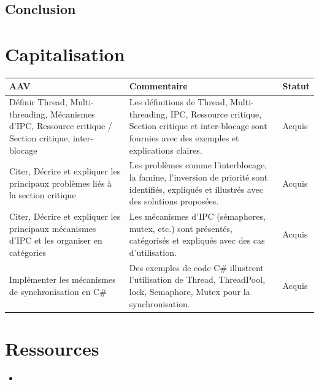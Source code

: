 \subsection*{Conclusion}
{}

\newpage

\section*{Capitalisation}

\begin{center}
\setlength{\tabcolsep}{10pt}

\begin{tabular}{|p{}|p{}|m{}|}
\hline
\textbf{AAV} & \textbf{Commentaire} & \textbf{Statut} \\ \hline

Définir Thread, Multi-threading, Mécanismes d'IPC, Ressource critique / Section critique, inter-blocage &
Les définitions de Thread, Multi-threading, IPC, Ressource critique, Section critique et inter-blocage sont fournies avec des exemples et explications claires. &
{\color{green!60!black}Acquis} \\ \hline

Citer, Décrire et expliquer les principaux problèmes liés à la section critique &
Les problèmes comme l'interblocage, la famine, l'inversion de priorité sont identifiés, expliqués et illustrés avec des solutions proposées. &
{\color{green!60!black}Acquis} \\ \hline

Citer, Décrire et expliquer les principaux mécanismes d'IPC et les organiser en catégories &
Les mécanismes d'IPC (sémaphores, mutex, etc.) sont présentés, catégorisés et expliqués avec des cas d'utilisation. &
{\color{green!60!black}Acquis} \\ \hline

Implémenter les mécanismes de synchronisation en C\# &
Des exemples de code C\# illustrent l'utilisation de Thread, ThreadPool, lock, Semaphore, Mutex pour la synchronisation. &
{\color{green!60!black}Acquis} \\ \hline

\end{tabular}
\end{center}

\newpage

\section*{Ressources}

\begin{itemize}
	\item 
\end{itemize}
